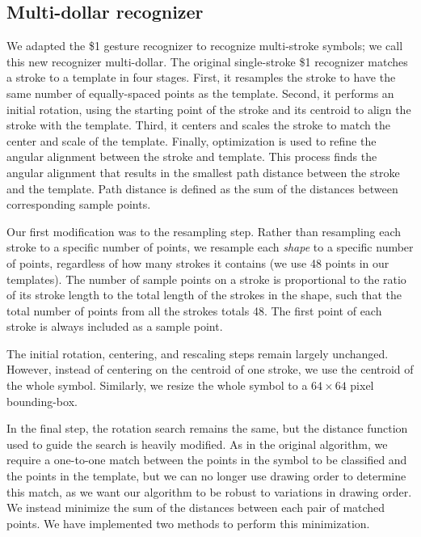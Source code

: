 \documentclass[final,5p,twocolumn]{elsarticle}
\begin{document}
\subsection{Multi-dollar recognizer}
We adapted the \$1 gesture recognizer to recognize multi-stroke symbols; 
we call this new recognizer multi-dollar.
The original single-stroke \$1 recognizer matches a stroke
to a template in four stages.  First, it resamples the
stroke to have the same number of equally-spaced points as the template.  
Second, it performs an initial rotation, using the
starting point of the stroke and its centroid to 
align the stroke with the template.
Third, it centers and scales the stroke to match the
center and scale of the template.  Finally, optimization
is used to refine the angular alignment between the
stroke and template. This process finds the 
angular alignment that results in the smallest path distance between
the stroke and the template. Path distance is defined as the sum of 
the distances between corresponding sample points. 

Our first modification was to the resampling step.  Rather than
resampling each stroke to a specific number of points, we
resample each \textit{shape} to a specific  number of points, 
regardless of how many strokes it contains (we use 48
points in our templates).  The number of sample points on a stroke
is proportional to the ratio of its
stroke length to the total length of the strokes in the shape, such
that the total number of points from all the strokes totals 48.  The first point 
of each stroke is always included as a sample point. 

The initial rotation, centering, and rescaling steps remain largely
unchanged. However, instead of centering on the centroid of one stroke, we use
the centroid of the whole symbol. Similarly, we resize the whole
symbol to a $64\times 64$ pixel bounding-box.

In the final step, the rotation search remains the same, but the
distance function used to guide the search is heavily modified.  
As in the original algorithm, we
require a one-to-one match between the points in the symbol
to be classified and the points in the template, but we can no longer use drawing
order to determine this match, as we want our
algorithm to be robust to variations in drawing order.  We instead 
minimize the sum of the distances between
each pair of matched points.  We have implemented two methods to perform this
minimization.
\end{document}
